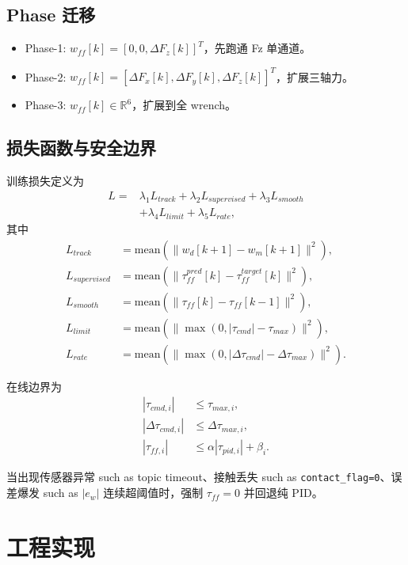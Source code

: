 \documentclass[11pt,a4paper]{article}
\begin{document}
\subsection{Phase 迁移}
\begin{itemize}[leftmargin=1.2em]
  \item Phase-1: $w_{ff}[k]=[0,0,\Delta F_z[k]]^T$，先跑通 Fz 单通道。
  \item Phase-2: $w_{ff}[k]=[\Delta F_x[k],\Delta F_y[k],\Delta F_z[k]]^T$，扩展三轴力。
  \item Phase-3: $w_{ff}[k]\in\mathbb{R}^6$，扩展到全 wrench。
\end{itemize}

\subsection{损失函数与安全边界}
训练损失定义为
\begin{equation}
\begin{aligned}
L = &\lambda_1 L_{track} + \lambda_2 L_{supervised} + \lambda_3 L_{smooth} \\
    &+ \lambda_4 L_{limit} + \lambda_5 L_{rate},
\end{aligned}
\end{equation}
其中
\begin{align}
L_{track} &= \mathrm{mean}\left(\|w_d[k+1]-w_m[k+1]\|^2\right), \\
L_{supervised} &= \mathrm{mean}\left(\|\tau_{ff}^{pred}[k]-\tau_{ff}^{target}[k]\|^2\right), \\
L_{smooth} &= \mathrm{mean}\left(\|\tau_{ff}[k]-\tau_{ff}[k-1]\|^2\right), \\
L_{limit} &= \mathrm{mean}\left(\|\max(0,|\tau_{cmd}|-\tau_{max})\|^2\right), \\
L_{rate} &= \mathrm{mean}\left(\|\max(0,|\Delta\tau_{cmd}|-\Delta\tau_{max})\|^2\right).
\end{align}

在线边界为
\begin{align}
|\tau_{cmd,i}| &\le \tau_{max,i}, \\
|\Delta\tau_{cmd,i}| &\le \Delta\tau_{max,i}, \\
|\tau_{ff,i}| &\le \alpha |\tau_{pid,i}| + \beta_i.
\end{align}

当出现传感器异常 such as topic timeout、接触丢失 such as \texttt{contact\_flag=0}、误差爆发 such as $|e_w|$ 连续超阈值时，强制 $\tau_{ff}=0$ 并回退纯 PID。

\section{工程实现}
\end{document}
